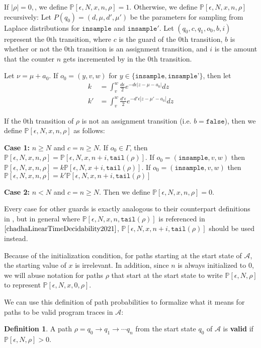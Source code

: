 \documentclass[12pt]{article}
\newcommand{\PP}{\mathbb{P}}
\theoremstyle{definition}
\newtheorem{defn}[thm]{Definition}
\begin{document}
If $|\rho| = 0, $, we define $\PP[\epsilon, N, x, n, \rho] = 1$.
Otherwise, we define $\PP[\epsilon, N, x, n, \rho]$ recursively:
Let $P(q_0) = (d, \mu, d', \mu')$ be the parameters for sampling from Laplace distributions for $\texttt{insample}$ and $\texttt{insample}'$. Let $(q_0, c, q_1, o_0, b, i)$ represent the 0th transition, where $c$ is the guard of the 0th transition, $b$ is whether or not the 0th transition is an assignment transition, and $i$ is the amount that the counter $n$ gets incremented by in the 0th transition.

Let $\nu = \mu + a_0$. If $o_0 = (y, v, w)$ for $y\in \{\texttt{insample}, \texttt{insample'}\}$, then let \begin{align*}
	k &= \int_{v}^{w}\frac{d\epsilon}{2}e^{-d\epsilon|z-\mu-a_0|}dz\\
	k' &= \int_v^w\frac{d'\epsilon}{2}e^{-d'\epsilon|z-\mu'-a_0|}dz
\end{align*}


If the 0th transition of $\rho$ is not an assignment transition (i.e. $b = \texttt{false}$), then we define $\PP[\epsilon, N, x, n, \rho]$ as follows:

\textbf{Case 1:} $n\geq N$ and $c = n \geq N$.
If $o_0 \in \Gamma$, then $\PP[\epsilon, N, x, n, \rho] = \PP[\epsilon, N, x, n+i, \texttt{tail}(\rho)]$. If $o_0 = (\texttt{insample}, v, w)$ then $\PP[\epsilon, N, x, n, \rho] = k\PP[\epsilon, N, x+i, \texttt{tail}(\rho)]$. If $o_0 = (\texttt{insample}, v, w)$ then $\PP[\epsilon, N, x, n, \rho] = k'\PP[\epsilon, N, x, n+i, \texttt{tail}(\rho)]$

\textbf{Case 2:} $n < N$ and $c = n\geq N$. Then we define $\PP[\epsilon, N, x, n, \rho] = 0$.

Every case for other guards is exactly analogous to their counterpart definitions in \cite{chadhaLinearTimeDecidability2021}, but in general where $\PP[\epsilon,N, x, n, \texttt{tail}(\rho)]$ is referenced in $\cite{chadhaLinearTimeDecidability2021}$, $\PP[\epsilon, N,x, n+i ,\texttt{tail}(\rho)]$ should be used instead.

Because of the initialization condition, for paths starting at the start state of $\mathcal{A}$, the starting value of $x$ is irrelevant. In addition, since $n$ is always initialized to 0, we will abuse notation for paths $\rho$ that start at the start state to write $\PP[\epsilon, N, \rho]$ to represent $\PP[\epsilon, N, x, 0, \rho]$.

We can use this definition of path probabilities to formalize what it means for paths to be valid program traces in $\mathcal{A}$:
\begin{defn}
	A path $\rho = q_0\to q_1\to\cdots q_n$ from the start state $q_0$ of $\mathcal{A}$ is \textbf{valid} if $\PP[\epsilon, N, \rho]> 0$.
\end{defn}
\end{document}
